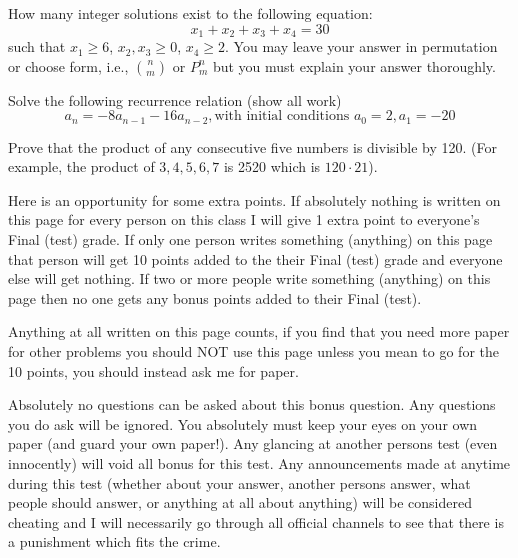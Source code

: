\documentclass[addpoints,12pt]{exam}
\begin{document}
\begin{questions}
  \newpage
  \question[7] How many integer solutions exist to the following equation:
  \[
    x_1 + x_2 + x_3 + x_4 = 30
  \]
  such that $x_1\geq 6$, $x_2,x_3 \geq 0$, $x_4 \geq 2$. You may leave your answer in permutation or choose form, i.e., $\binom{n}{m}$ or $P^n_m$ but you must explain your answer thoroughly.
  \vspace*{10cm}
  \begin{solution}
  \end{solution}

  \newpage
  \question[7] Solve the following recurrence relation (show all work)
  \[
    a_n = -8a_{n-1} - 16a_{n-2}, \text{with initial conditions } a_0 =2, a_1 = -20
  \]
  \vspace*{8cm}
  \begin{solution}
  \end{solution}

  \newpage
  \question[20] Prove that the product of any consecutive five numbers is divisible by 120. (For example, the product of $3,4,5,6,7$ is 2520 which is $120\cdot 21$).
  \vspace*{8cm}
  \begin{solution}
  \end{solution}

  \newpage
  \bonusquestion[10] Here is an opportunity for some extra points. If absolutely nothing is written on this page for every person on this class I will give 1 extra point to everyone's Final (test) grade. If only one person writes something (anything) on this page that person will get 10 points added to the their Final (test) grade and everyone else will get nothing. If two or more people write something (anything) on this page then no one gets any bonus points added to their Final (test). 

  Anything at all written on this page counts, if you find that you need more paper for other problems you should NOT use this page unless you mean to go for the 10 points, you should instead ask me for paper.

  Absolutely no questions can be asked about this bonus question. Any questions you do ask will be ignored. You absolutely must keep your eyes on your own paper (and guard your own paper!). Any glancing at another persons test (even innocently) will void all bonus for this test. Any announcements made at anytime during this test (whether about your answer, another persons answer, what people should answer, or anything at all about anything) will be considered cheating and I will necessarily go through all official channels to see that there is a punishment which fits the crime.

\end{questions}
\end{document}

